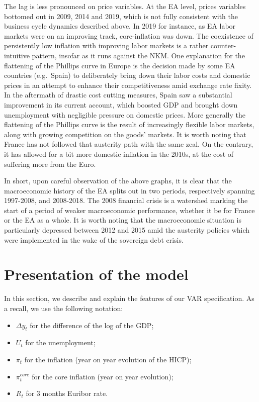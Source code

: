 \documentclass[
  11pt,
]{article}
\providecommand{\tightlist}{%
  \setlength{\itemsep}{0pt}\setlength{\parskip}{0pt}}
\begin{document}
The lag is less pronounced on price variables. At the EA level, prices variables bottomed out in 2009, 2014 and 2019, which is not fully consistent with the business cycle dynamics described above. In 2019 for instance, as EA labor markets were on an improving track, core-inflation was down. The coexistence of persistently low inflation with improving labor markets is a rather counter-intuitive pattern, insofar as it runs against the NKM. One explanation for the flattening of the Phillips curve in Europe is the decision made by some EA countries (e.g.~Spain) to deliberately bring down their labor costs and domestic prices in an attempt to enhance their competitiveness amid exchange rate fixity. In the aftermath of drastic cost cutting measures, Spain saw a substantial improvement in its current account, which boosted GDP and brought down unemployment with negligible pressure on domestic prices. More generally the flattening of the Phillips curve is the result of increasingly flexible labor markets, along with growing competition on the goods' markets. It is worth noting that France has not followed that austerity path with the same zeal. On the contrary, it has allowed for a bit more domestic inflation in the 2010s, at the cost of suffering more from the Euro.

In short, upon careful observation of the above graphs, it is clear that the macroeconomic history of the EA splits out in two periods, respectively spanning 1997-2008, and 2008-2018. The 2008 financial crisis is a watershed marking the start of a period of weaker macroeconomic performance, whether it be for France or the EA as a whole. It is worth noting that the macroeconomic situation is particularly depressed between 2012 and 2015 amid the austerity policies which were implemented in the wake of the sovereign debt crisis.

\hypertarget{sec:model}{%
\section{Presentation of the model}\label{sec:model}}

In this section, we describe and explain the features of our VAR specification. As a recall, we use the following notation:

\begin{itemize}
\tightlist
\item
  \(\Delta y_t\) for the difference of the log of the GDP;
\item
  \(U_t\) for the unemployment;
\item
  \(\pi_t\) for the inflation (year on year evolution of the HICP);
\item
  \(\pi_t^{core}\) for the core inflation (year on year evolution);
\item
  \(R_t\) for 3 months Euribor rate.
\end{itemize}
\end{document}
